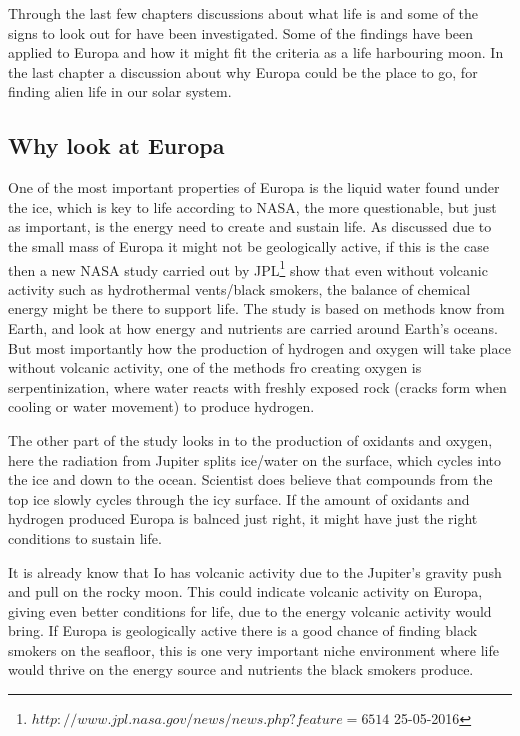 Through the last few chapters discussions about what life is and some of the signs to look out for have been investigated. Some of the findings have been applied to Europa and how it might fit the criteria as a life harbouring moon. In the last chapter a discussion about why Europa could be the place to go, for finding alien life in our solar system.\par

\subsection{Why look at Europa}

One of the most important properties of Europa is the liquid water found under the ice, which is key to life according to NASA, the more questionable, but just as important, is the energy need to create and sustain life. As discussed due to the small mass of Europa it might not be geologically active, if this is the case then a new NASA study carried out by JPL\footnote{$http://www.jpl.nasa.gov/news/news.php?feature=6514$ 25-05-2016} show that even without volcanic activity such as hydrothermal vents/black smokers, the balance of chemical energy might be there to support life. The study is based on methods know from Earth, and look at how energy and nutrients are carried around Earth’s oceans. But most importantly how the production of hydrogen and oxygen will take place without volcanic activity, one of the methods fro creating oxygen is serpentinization, where water reacts with freshly exposed rock (cracks form when cooling or water movement) to produce hydrogen. \par
The other part of the study looks in to the production of oxidants and oxygen, here the radiation from Jupiter splits ice/water on the surface, which cycles into the ice and down to the ocean. Scientist does believe that compounds from the top ice slowly cycles through the icy surface. If the amount of oxidants and hydrogen produced Europa is balnced just right, it might have just the right conditions to sustain life. \par
It is already know that Io has volcanic activity due to the Jupiter’s gravity push and pull on the rocky moon. This could indicate volcanic activity on Europa, giving even better conditions for life, due to the energy volcanic activity would bring. If Europa is geologically active there is a good chance of finding black smokers on the seafloor, this is one very important niche environment where life would thrive on the energy source and nutrients the black smokers produce.\par
